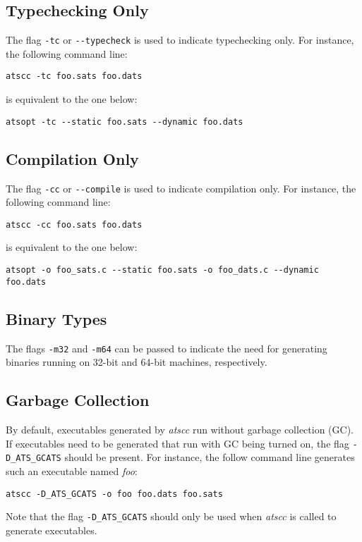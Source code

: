 \subsection{Typechecking Only}
The flag \verb`-tc` or \verb`--typecheck` is used to indicate typechecking
only. For instance, the following command line:
\begin{verbatim}
atscc -tc foo.sats foo.dats
\end{verbatim}
is equivalent to the one below:
\begin{verbatim}
atsopt -tc --static foo.sats --dynamic foo.dats
\end{verbatim}

\subsection{Compilation Only}
The flag \verb`-cc` or \verb`--compile` is used to indicate compilation only.
For instance, the following command line:
\begin{verbatim}
atscc -cc foo.sats foo.dats
\end{verbatim}
is equivalent to the one below:
\begin{verbatim}
atsopt -o foo_sats.c --static foo.sats -o foo_dats.c --dynamic foo.dats
\end{verbatim}

\subsection{Binary Types}
The flags \verb`-m32` and \verb`-m64` can be passed to indicate the need
for generating binaries running on 32-bit and 64-bit machines, respectively.

\subsection{Garbage Collection}
By default, executables generated by {\it atscc} run without garbage
collection (GC). If executables need to be generated that run with GC being
turned on, the flag \verb`-D_ATS_GCATS` should be present.  For instance,
the follow command line generates such an executable named {\it foo}:
\begin{verbatim}
atscc -D_ATS_GCATS -o foo foo.dats foo.sats
\end{verbatim}
Note that the flag \verb`-D_ATS_GCATS` should only be used when {\it atscc}
is called to generate executables.

